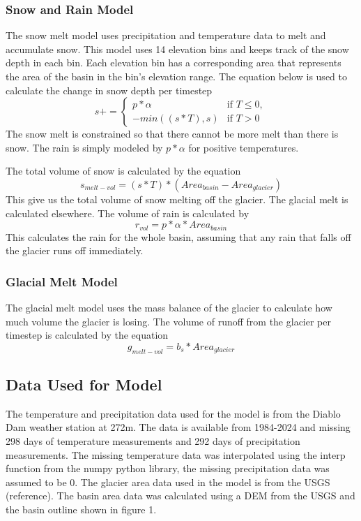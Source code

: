 \documentclass{article}
\begin{document}
\subsubsection{Snow and Rain Model}
The snow melt model uses precipitation and temperature data to melt and accumulate snow. This model uses 14 elevation bins and keeps track 
of the snow depth in each bin. Each elevation bin has a corresponding area that represents the area of the basin in the bin's elevation range. 
The equation below is used to calculate the change in snow depth per timestep 
\begin{equation}s += 
\begin{cases} 
  p*\alpha & \text{if } T \leq 0,\\
  -min((s*T),s) & \text{if } T > 0
\end{cases}\end{equation}
The snow melt is constrained so that there cannot be more melt than there is snow. The rain is simply modeled by $p*\alpha$ for positive 
temperatures.

The total volume of snow is calculated by the equation
\begin{equation}s_{melt-vol}=(s*T)*({Area}_{basin}-{Area}_{glacier})\end{equation}
This give us the total volume of snow melting off the glacier. The glacial melt is calculated elsewhere. The volume of rain is calculated by
\begin{equation}r_{vol}=p*\alpha*{Area}_{basin}\end{equation}
This calculates the rain for the whole basin, assuming that any rain that falls off the glacier runs off immediately.

\subsubsection{Glacial Melt Model}
The glacial melt model uses the mass balance of the glacier to calculate how much volume the glacier is losing. The volume of runoff from the 
glacier per timestep is calculated by the equation
\begin{equation}g_{melt-vol}=b_s*{Area}_{glacier}\end{equation}
\subsection{Data Used for Model}
The temperature and precipitation data used for the model is from the Diablo Dam weather station at 272m. The data is available from 1984-2024 
and missing 298 days of temperature measurements and 292 days of precipitation measurements. The missing temperature data was interpolated 
using the interp function from the numpy python library, the missing precipitation data was assumed to be 0. The glacier area data used in 
the model is from the USGS (reference). The basin area data was calculated using a DEM from the USGS and the basin outline shown in figure 1.
\end{document}
